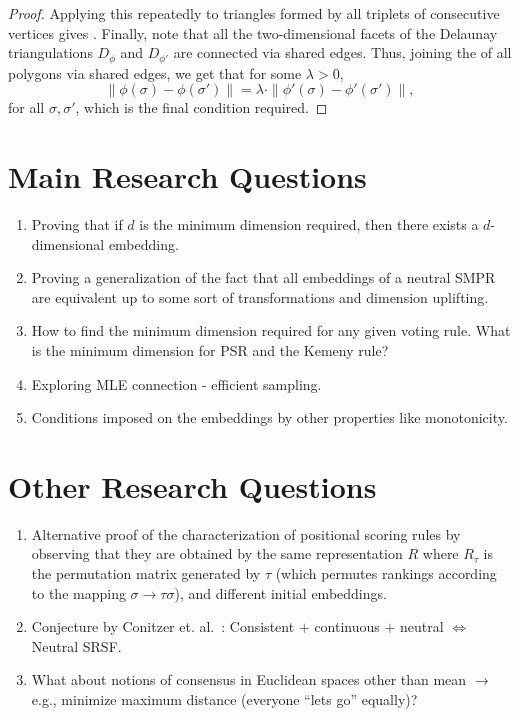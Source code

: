 \documentclass[10pt,letterpaper]{article}
\begin{document}
\begin{proof}
Applying this repeatedly to triangles formed by all triplets of consecutive vertices gives . Finally, note that all the two-dimensional facets of the Delaunay triangulations $D_{\phi}$ and $D_{\phi'}$ are connected via shared edges. Thus, joining the  of all polygons via shared edges, we get that for some $\lambda > 0$,
$$
\|\phi(\sigma)-\phi(\sigma')\| = \lambda \cdot \|\phi'(\sigma)-\phi'(\sigma')\|,
$$
for all $\sigma, \sigma'$, which is the final condition required.
\end{proof}

\section{Main Research Questions}
\begin{enumerate}
\item Proving that if $d$ is the minimum dimension required, then there exists a $d$-dimensional embedding.
\item Proving a generalization of the fact that all embeddings of a neutral SMPR are equivalent up to some sort of transformations and dimension uplifting. 
\item How to find the minimum dimension required for any given voting rule. What is the minimum dimension for PSR and the Kemeny rule?
\item Exploring MLE connection - efficient sampling.
\item Conditions imposed on the embeddings by other properties like monotonicity.
\end{enumerate}

\section{Other Research Questions}
\begin{enumerate}
\item Alternative proof of the characterization of positional scoring rules by observing that they are obtained by the same representation $R$ where $R_{\tau}$ is the permutation matrix generated by $\tau$ (which permutes rankings according to the mapping $\sigma \rightarrow \tau \sigma$), and different initial embeddings. 
\item Conjecture by Conitzer et. al.~\cite{CRX09}: Consistent $+$ continuous $+$ neutral $\Leftrightarrow$ Neutral SRSF.
\item What about notions of consensus in Euclidean spaces other than mean $\rightarrow$ e.g., minimize maximum distance (everyone ``lets go'' equally)?
\end{enumerate}
\end{document}
